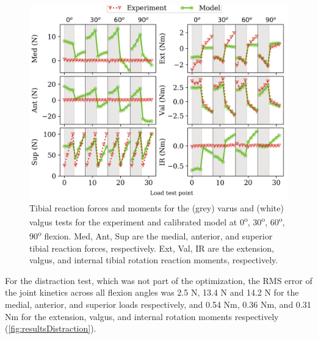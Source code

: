 \begin{figure}
    \centering
    \includegraphics[width=0.80\linewidth]{../img/Spec1_VV_OptimizationResults_APVV_0_30_60_90.png}
    \caption{Tibial reaction forces and moments for the (grey) varus and (white) valgus tests for the experiment and calibrated model at 0\textsuperscript{o}, 30\textsuperscript{o}, 60\textsuperscript{o}, 90\textsuperscript{o} flexion. Med, Ant, Sup are the medial, anterior, and superior tibial reaction forces, respectively. Ext, Val, IR are the extension, valgus, and internal tibial rotation reaction moments, respectively.}
    \label{fig:optimizationVVResults}
\end{figure}

For the distraction test, which was not part of the optimization, the RMS error of the joint kinetics across all flexion angles was 2.5 N, 13.4 N and 14.2 N for the medial, anterior, and superior loads respectively, and 0.54 Nm, 0.36 Nm, and 0.31 Nm for the extension, valgus, and internal rotation moments respectively (\autoref{fig:resultsDistraction}).

